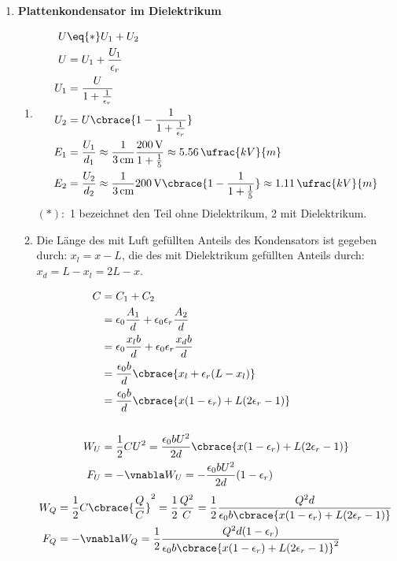 \documentclass[11pt,letterpaper]{article}
\begin{document}

\begin{enumerate}
    \item \textbf{Plattenkondensator im Dielektrikum}
    \begin{enumerate}
        \item
        \begin{align*}
            U &\eq{*} U_1 + U_2\\
            U &= U_1 + \frac{U_1}{\epsilon_r}\\
            U_1 &= \frac{U}{1 + \frac{1}{\epsilon_r}}\\
            U_2 &= U \cbrace{1 - \frac{1}{1 + \frac{1}{\epsilon_r}}}\\
            E_1 &= \frac{U_1}{d_1} \approx \frac{1}{3\,\mathrm{cm}} \frac{200\,\mathrm{V}}{1 + \frac{1}{5}}\approx 5.56\,\ufrac{kV}{m} \\
            E_2 &= \frac{U_2}{d_2} \approx \frac{1}{3\,\mathrm{cm}} 200\,\mathrm{V}\cbrace{1 - \frac{1}{1 + \frac{1}{5}}} \approx 1.11\,\ufrac{kV}{m}
        \end{align*}
        $(*):$ 1 bezeichnet den Teil ohne Dielektrikum, 2 mit Dielektrikum.
        \\
        \item
        Die Länge des mit Luft gefüllten Anteils des Kondensators ist gegeben durch:
        $x_l = x-L$, die des mit Dielektrikum gefüllten Anteils durch: 
        $x_d  = L - x_l = 2L-x$.

        \begin{align*}
            C &= C_1 + C_2\\
            &= \epsilon_0 \frac{A_1}{d} + \epsilon_0\epsilon_r \frac{A_2}{d}\\
            &= \epsilon_0 \frac{x_l b}{d} + \epsilon_0\epsilon_r \frac{x_db}{d}\\
            &= \frac{\epsilon_0 b}{d} \cbrace{x_l + \epsilon_r (L-x_l)}\\
            &= \frac{\epsilon_0 b}{d} \cbrace{x(1 - \epsilon_r ) + L ( 2\epsilon_r - 1)}\\
            \\
            W_U &= \frac{1}{2}C U^2 = \frac{\epsilon_0 b U^2}{2d} \cbrace{x(1 - \epsilon_r ) + L ( 2\epsilon_r - 1)}\\
            F_U &= -\vnabla W_U = -\frac{\epsilon_0 b U^2}{2d}(1 - \epsilon_r ) \\
        \end{align*}
        \begin{align*}
            W_Q &= \frac{1}{2}C \cbrace{\frac{Q}{C}}^2= \frac{1}{2}\frac{Q^2}{C}= \frac{1}{2}\frac{Q^2d}{\epsilon_0 b \cbrace{x(1 - \epsilon_r ) + L ( 2\epsilon_r - 1)}}\\
            F_Q &= -\vnabla W_Q 
            = \frac{1}{2}\frac{Q^2d(1 - \epsilon_r )}{\epsilon_0 b \cbrace{x(1 - \epsilon_r ) + L ( 2\epsilon_r - 1)}^2}
        \end{align*}
    \end{enumerate}


\end{enumerate}
\end{document}
